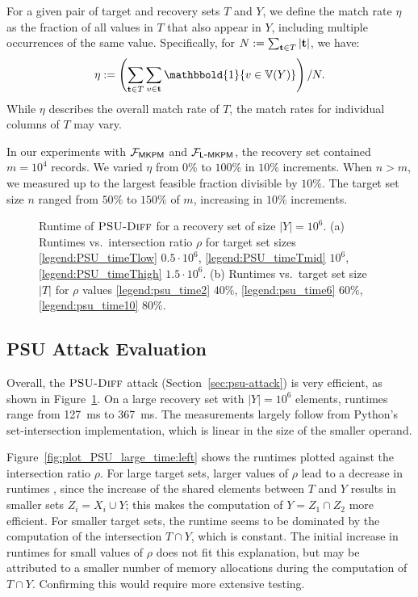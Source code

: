 For a given pair of target and recovery sets $T$ and $Y$, we define the match rate $\eta$ as the fraction of all values in $T$ that also appear in $Y$, including multiple occurrences of the same value. Specifically, for $N := \sum_{\mathbf{t} \in T} |\mathbf{t}|$, we have:
\[
\eta := \left(\sum_{\bt \in T} \sum_{v \in \bt} \mathbbold{1}\{v\in \Ispace[Y]\}\right)/ N.
\]
While $\eta$ describes the overall match rate of $T$, the match rates for individual columns of $T$ may vary.

In our experiments with $\mathcal{F}_{\mathsf{MKPM}}$ and $\mathcal{F}_{\mathsf{L\mbox{-}MKPM}}$, the recovery set contained $m = 10^4$ records. We varied $\eta$ from $0\%$ to $100\%$ in $10\%$ increments. When $n > m$, we measured up to the largest feasible fraction divisible by $10\%$. The target set size $n$ ranged from $50\%$ to $150\%$ of $m$, increasing in $10\%$ increments.

\begin{figure}
	\centering
    \subfloat[$\PSUattack{}$\label{fig:plot_PSU_large_time:left}]{
    
    }
    \hspace{0.1mm}
    \subfloat[$\PSUattack{}$\label{fig:plot_PSU_large_time:right}]{
    
    }
	\caption{Runtime of $\PSUattack{}$ for a recovery set of size $|Y| = 10^6$. 
	(a) Runtimes vs.\ intersection ratio $\rho$ for target set sizes \ref{legend:PSU_timeTlow} $0.5 \cdot 10^6$, \ref{legend:PSU_timeTmid} $10^6$, \ref{legend:PSU_timeThigh} $1.5 \cdot 10^6$.
	(b) Runtimes vs.\ target set size $|T|$ for $\rho$ values \ref{legend:psu_time2} $40\%$, \ref{legend:psu_time6} $60\%$, \ref{legend:psu_time10} $80\%$.}
	\label{fig:plot_PSU_large_time}
\end{figure}

\subsection{PSU Attack Evaluation}
Overall, the ${\textsc{PSU\mbox{-}Diff}}$ attack (Section~\ref{sec:psu-attack}) is very efficient, as shown in Figure~\ref{fig:plot_PSU_large_time}.
On a large recovery set with $|Y| = 10^6$ elements, runtimes range from \SI{127}{\milli\second} to \SI{367}{\milli\second}. The measurements largely follow from Python's set-intersection implementation, which is linear in the size of the smaller operand.

Figure~\ref{fig:plot_PSU_large_time:left} shows the runtimes plotted against the intersection ratio $\rho$.
For large target sets, larger values of $\rho$ lead to a decrease in runtimes , since the increase of the shared elements between $T$ and $Y$ results in smaller sets $Z_i = X_i \cup Y$; this makes the computation of $Y = Z_1 \cap Z_2$ more efficient.
For smaller target sets, the runtime seems to be dominated by the computation
of the intersection $T \cap Y$, which is constant.
The initial increase in runtimes for small values of $\rho$ 
does not fit this explanation, but may be attributed to a smaller number of memory allocations during the computation of $T \cap Y$. Confirming this would require more extensive testing.

